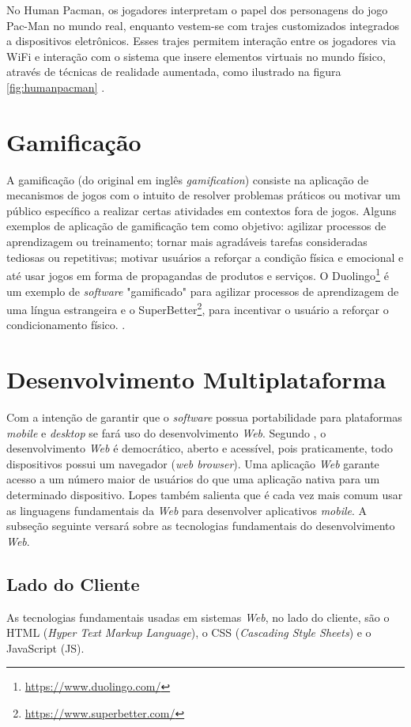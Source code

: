 No Human Pacman, os jogadores interpretam o papel dos personagens do jogo Pac-Man no mundo real, enquanto vestem-se com trajes customizados integrados a dispositivos eletrônicos. Esses trajes permitem interação entre os jogadores via WiFi e interação com o sistema que insere elementos virtuais no mundo físico, através de técnicas de realidade aumentada, como ilustrado na figura \ref{fig:humanpacman} \cite{cheok2003}. 

\section{Gamificação}
A gamificação (do original em inglês \textit{gamification}) consiste na aplicação de mecanismos de jogos com o intuito de resolver problemas práticos ou motivar um público específico a realizar certas atividades em contextos fora de jogos. Alguns exemplos de aplicação de gamificação tem como objetivo: agilizar processos de aprendizagem ou treinamento; tornar mais agradáveis tarefas consideradas tediosas ou repetitivas; motivar usuários a reforçar a condição física e emocional e até usar jogos em forma de propagandas de produtos e serviços. O Duolingo\footnote{\url{https://www.duolingo.com/}} é um exemplo de \textit{software} "gamificado" para agilizar processos de aprendizagem de uma língua estrangeira e o SuperBetter\footnote{\url{https://www.superbetter.com/}}, para incentivar o usuário a reforçar o condicionamento físico. \cite{vianna2013, zichermann2011}.

\section{Desenvolvimento Multiplataforma}
Com a intenção de garantir que o \textit{software} possua portabilidade para plataformas \textit{mobile} e \textit{desktop} se fará uso do desenvolvimento \textit{Web}. Segundo \citet{lopes2013}, o desenvolvimento \textit{Web} é democrático, aberto e acessível, pois praticamente, todo dispositivos possui um navegador (\textit{web browser}). Uma aplicação \textit{Web} garante acesso a um número maior de usuários do que uma aplicação nativa para um determinado dispositivo. Lopes também salienta que é cada vez mais comum usar as linguagens fundamentais da \textit{Web} para desenvolver aplicativos \textit{mobile}. A subseção seguinte versará sobre as tecnologias fundamentais do desenvolvimento \textit{Web}.

\subsection{Lado do Cliente}
As tecnologias fundamentais usadas em sistemas \textit{Web}, no lado do cliente, são o HTML (\textit{Hyper Text Markup Language}), o CSS (\textit{Cascading Style Sheets}) e o JavaScript (JS). \par

